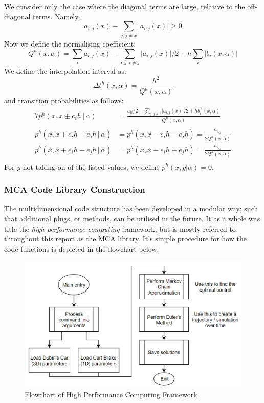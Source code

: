 \documentclass[11pt,draftd]{article}
\begin{document}
We consider only the case where the diagonal terms are large, relative to the off-diagonal terms. Namely, 
\begin{equation*} 
  a_{i,j}(x) - \sum_{j:j\ne x}\lvert a_{i,j}(x) \rvert \ge 0 
\end{equation*} 
Now we define the normalising coefficient: 
\begin{equation*} 
  Q^{h}(x,\alpha) = \sum_{i}a_{i,j}(x) - \sum_{i,j:i\ne j}\lvert a_{i,j}(x) \rvert/2 + h\sum_{i}\lvert b_{i}(x,\alpha) \rvert 
\end{equation*} 
We define the interpolation interval as:
\begin{equation*}
	\Delta t^{h}(x,\alpha) = \frac{h^{2}}{Q^{h}(x,\alpha)}
\end{equation*} 
and transition probabilities as follows:
\begin{align*} 7
  p^{h}(x, x\pm e_{i}h \,\vert\, \alpha) &= \frac{a_{ii}/2 - \sum_{j, j\ne i} \lvert a_{i,j}(x) \rvert /2 + hb_{i}^{\pm}(x,\alpha)  }{Q^{h}(x,\alpha)} \\ 
  p^{h}(x, x + e_{i}h + e_{j}h \,\vert\, \alpha) &= p^{h}(x, x - e_{i}h - e_{j}h) = \frac{a_{i,j}^{+}}{2Q^{h}(x,\alpha)} \\ 
  p^{h}(x, x + e_{i}h - e_{j}h \,\vert\, \alpha) &= p^{h}(x, x - e_{i}h + e_{j}h) = \frac{a_{i,j}^{-}}{2Q^{h}(x,\alpha)} \\ 
\end{align*} 
For $ y $ not taking on of the listed values, we define $ p^{h}(x,y\vert \alpha) = 0$. 
\subsubsection{MCA Code Library Construction} 
The multidimensional code structure has been developed in a modular way; such that additional plugs, or methods, can be utilised in the future. It as a whole was title the \textit{high performance computing} framework, but is mostly referred to throughout this report as the MCA library. It's simple procedure for how the code functions is depicted in the flowchart below.

\begin{figure}[H]
	\centering
	\includegraphics[scale=0.5]{images/code-flowchart.jpg}
	\caption{Flowchart of High Performance Computing Framework}
\end{figure}
\end{document}
